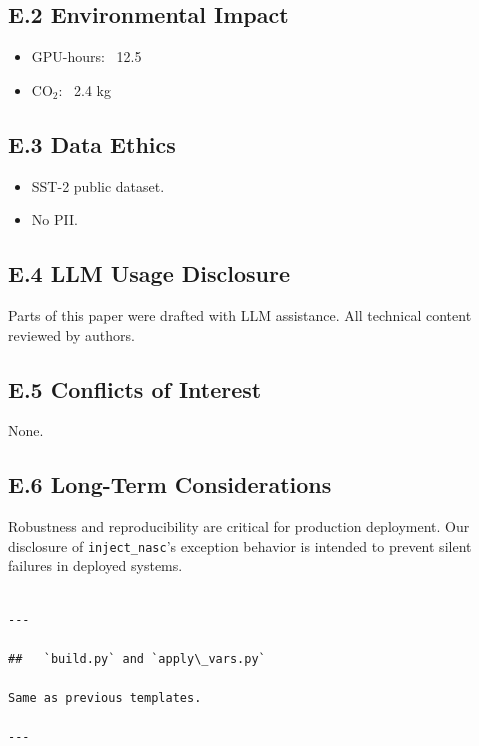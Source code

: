 \subsection{E.2 Environmental Impact}

\begin{itemize}
\item GPU-hours: ~12.5
\item CO$_2$: ~2.4 kg

\end{itemize}
\subsection{E.3 Data Ethics}

\begin{itemize}
\item SST-2 public dataset.
\item No PII.

\end{itemize}
\subsection{E.4 LLM Usage Disclosure}

Parts of this paper were drafted with LLM assistance. All technical content 
reviewed by authors.

\subsection{E.5 Conflicts of Interest}

None.

\subsection{E.6 Long-Term Considerations}

Robustness and reproducibility are critical for production deployment. 
Our disclosure of \texttt{inject\_nasc}'s exception behavior is intended to 
prevent silent failures in deployed systems.
\begin{lstlisting}

---

##   `build.py` and `apply\_vars.py`

Same as previous templates.

---
\end{lstlisting}

